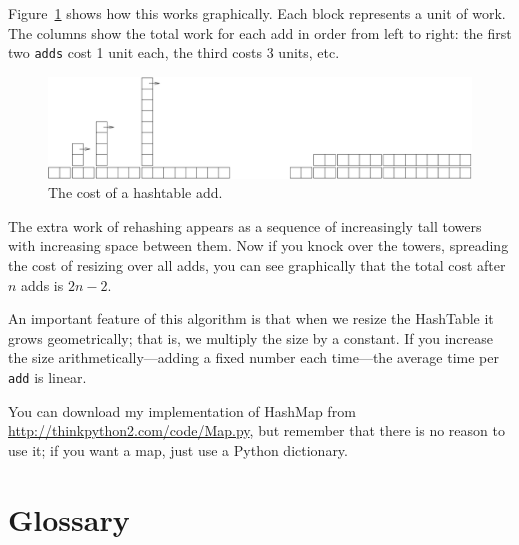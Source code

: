 \documentclass[10pt]{book}
\begin{document}
Figure~\ref{fig.hash} shows how this works graphically.  Each
block represents a unit of work.  The columns show the total
work for each add in order from left to right: the first two
{\tt adds} cost 1 unit each, the third costs 3 units, etc.

\begin{figure}
\centerline{\includegraphics[width=5.5in]{figs/towers.pdf}}
\caption{The cost of a hashtable add.\label{fig.hash}}
\end{figure}

The extra work of rehashing appears as a sequence of increasingly
tall towers with increasing space between them.  Now if you knock
over the towers, spreading the cost of resizing over all
adds, you can see graphically that the total cost after $n$
adds is $2n - 2$.

An important feature of this algorithm is that when we resize the
HashTable it grows geometrically; that is, we multiply the size by a
constant.  If you increase the size
arithmetically---adding a fixed number each time---the average time
per {\tt add} is linear.

You can download my implementation of HashMap from
\url{http://thinkpython2.com/code/Map.py}, but remember that there
is no reason to use it; if you want a map, just use a Python dictionary.

\section{Glossary}
\end{document}

